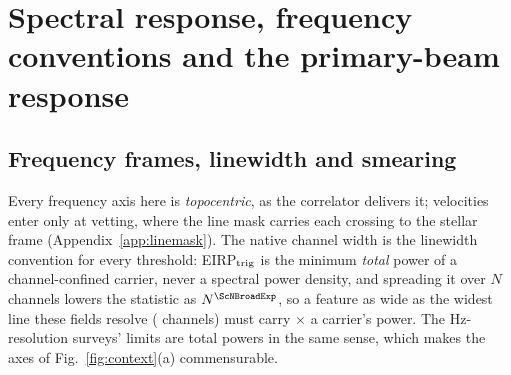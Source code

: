\section{Spectral response, frequency conventions and the primary-beam
response}
\label{app:conventions}


\subsection{Frequency frames, linewidth and smearing}

Every frequency axis here is \emph{topocentric}, as the correlator delivers
it; velocities enter only at vetting, where the line mask carries each
crossing to the stellar frame (Appendix~\ref{app:linemask}). The native
channel width is the linewidth convention for every threshold:
EIRP$_{\rm trig}$ is the minimum \emph{total} power of a channel-confined
carrier, never a spectral power density, and spreading it over $N$ channels
lowers the statistic as $N^{\ScNBroadExp}$, so a feature as wide as the widest
line these fields resolve (\ScNBroadChan{} channels) must carry
\ScNBroadRatio$\times$ a carrier's power. The Hz-resolution surveys' limits
are total powers in the same sense, which makes the axes of
Fig.~\ref{fig:context}(a) commensurable.

